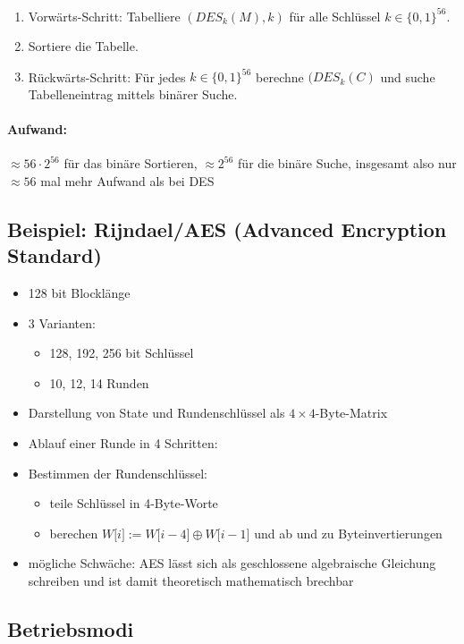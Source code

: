 \documentclass[a4paper,twoside,DIV15,BCOR12mm]{scrbook}
\begin{document}
\begin{enumerate}
	\item Vorwärts-Schritt: Tabelliere $({DES}_k(M), k)$ für alle Schlüssel $k \in { \{ 0, 1\} }^{56}$.
	\item Sortiere die Tabelle.
	\item Rückwärts-Schritt: Für jedes $k \in { \{ 0, 1\} }^{56}$ berechne $({DES}_k(C)$ und suche Tabelleneintrag mittels binärer Suche.
\end{enumerate}

\paragraph{Aufwand:} $\approx 56 \cdot 2^{56}$ für das binäre Sortieren, $\approx 2^{56}$ für die binäre Suche, insgesamt also nur $\approx 56$ mal mehr Aufwand als bei DES

\subsection{Beispiel: Rijndael/AES (Advanced Encryption Standard)}

\begin{itemize}
	\item 128 bit Blocklänge
	\item 3 Varianten:
		\begin{itemize}
			\item 128, 192, 256 bit Schlüssel
			\item 10, 12, 14 Runden
		\end{itemize}
	\item Darstellung von State und Rundenschlüssel als $4 \times 4$-Byte-Matrix
	\item Ablauf einer Runde in 4 Schritten: 
	\item Bestimmen der Rundenschlüssel:
		\begin{itemize}
			\item teile Schlüssel in 4-Byte-Worte
			\item berechen $W\lbrack i \rbrack := W\lbrack i-4 \rbrack \oplus W\lbrack i-1 \rbrack$ und ab und zu Byteinvertierungen
		\end{itemize}
	\item mögliche Schwäche: AES lässt sich als geschlossene algebraische Gleichung schreiben und ist damit theoretisch mathematisch brechbar
\end{itemize}

\subsection{Betriebsmodi}
\end{document}

